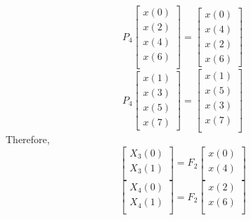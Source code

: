 \documentclass[journal,12pt,twocolumn]{IEEEtran}
\renewcommand\thesection{\arabic{section}}
\begin{document}
\begin{enumerate}[label=\arabic*.,ref=\thesection.\theenumi]
\begin{equation}
	\end{equation}
	\begin{equation}
		P_{4}
		\begin{bmatrix}
			x(0) \\ 
			x(2) \\ 
			x(4) \\ 
			x(6) \\
		\end{bmatrix}
		= 
		\begin{bmatrix}
			x(0) \\ 
			x(4) \\ 
			x(2) \\
			x(6)
		\end{bmatrix}
	\end{equation}
	\begin{equation}
		P_{4}
		\begin{bmatrix}
			x(1) \\ 
			x(3) \\ 
			x(5) \\
			x(7)
		\end{bmatrix}
		= 
		\begin{bmatrix}
			x(1) \\ 
			x(5) \\ 
			x(3) \\ 
			x(7) \\
		\end{bmatrix}
	\end{equation}
	Therefore,
	\begin{equation}
		\begin{bmatrix}
			X_{3}(0) \\ 
			X_{3}(1)\\ 
		\end{bmatrix}
		= F_{2}
		\begin{bmatrix}
			x(0) \\ 
			x(4) \\ 
		\end{bmatrix}
	\end{equation}
	\begin{equation}
		\begin{bmatrix}
			X_{4}(0) \\ 
			X_{4}(1)\\ 
		\end{bmatrix}
		= F_{2}
		\begin{bmatrix}
			x(2) \\ 
			x(6) \\ 
		\end{bmatrix}
	\end{equation}

\end{enumerate}
\end{document}
